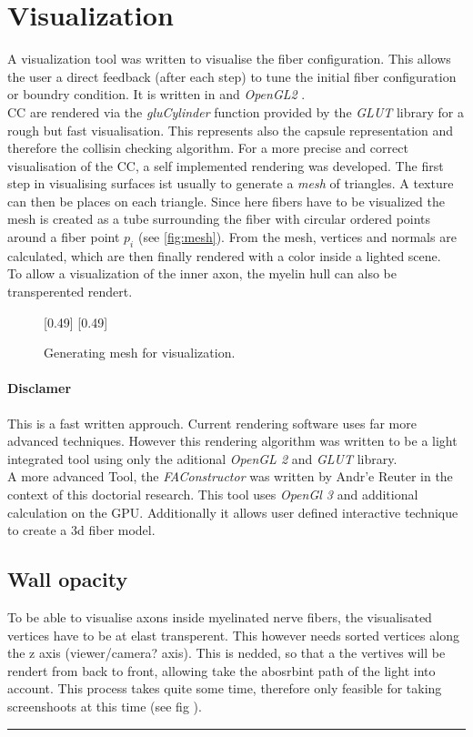 \section{Visualization}
% 
A visualization tool was written to visualise the fiber configuration.
This allows the user a direct feedback (\eg after each step) to tune the initial fiber configuration or boundry condition.
It is written in \CXX and \textit{OpenGL2} \cite{isocpp, khronos}.
\\
% 
\ac{CC} are rendered via the \textit{gluCylinder} function provided by the \textit{GLUT} library for a rough but fast visualisation.
This represents also the capsule representation and therefore the collisin checking algorithm.
For a more precise and correct visualisation of the \ac{CC}, a self implemented rendering was developed.
The first step in visualising surfaces ist usually to generate a \textit{mesh} of triangles.
A texture can then be places on each triangle.
Since here fibers have to be visualized the mesh is created as a tube surrounding the fiber with circular ordered points around a fiber point $p_i$ (see \cref{fig:mesh}).
From the mesh, vertices and normals are calculated, which are then finally rendered with a color inside a lighted scene.
\\
To allow a visualization of the inner axon, the myelin hull can also be transperented rendert.

% 
\begin{figure}[!t]
    \setlength{\tikzwidth}{0.5\textwidth}
    [0.49\textwidth]{
    }
    [0.49\textwidth]{
    }
	\caption{Generating mesh for visualization.}
	\label{fig:vis_mesh}
\end{figure}
% 
\paragraph{Disclamer}
This is a fast written approuch. Current rendering software uses far more advanced techniques. However this rendering algorithm was written to be a light integrated tool using only the aditional \textit{OpenGL 2} and \textit{GLUT} library.\\
% 
A more advanced Tool, the \textit{FAConstructor} \cite{Reuter2019} was written by Andr'e Reuter in the context of this doctorial research. This tool uses \textit{OpenGl 3} and additional calculation on the GPU. Additionally it allows user defined interactive technique to create a 3d fiber model.
% 
\subsection{Wall opacity}
% 
To be able to visualise axons inside myelinated nerve fibers, the visualisated vertices have to be at elast transperent.
This however needs sorted vertices along the z axis (viewer/camera? axis).
This is nedded, so that a the vertives will be rendert from back to front, allowing take the abosrbint path of the light into account.
This process takes quite some time, therefore only feasible for taking screenshoots at this time (see fig \dummy).
% 
% 
\vspace{5pt}
\hrule
\vspace{6pt}
% 
\newpage
% 
